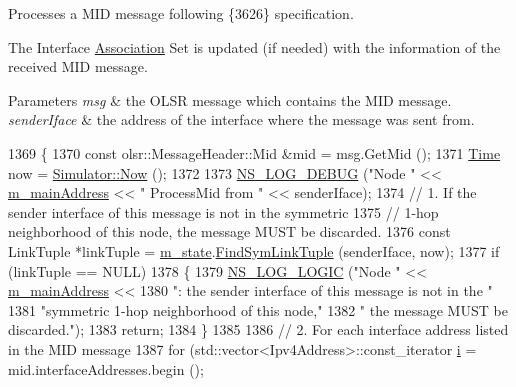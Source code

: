 Processes a M\+ID message following \{3626\} specification. 

The Interface \hyperlink{structns3_1_1olsr_1_1Association}{Association} Set is updated (if needed) with the information of the received M\+ID message.


\begin{DoxyParams}{Parameters}
{\em msg} & the O\+L\+SR message which contains the M\+ID message. \\
\hline
{\em sender\+Iface} & the address of the interface where the message was sent from. \\
\hline
\end{DoxyParams}

\begin{DoxyCode}
1369 \{
1370   \textcolor{keyword}{const} olsr::MessageHeader::Mid &mid = msg.GetMid ();
1371   \hyperlink{namespacens3_1_1TracedValueCallback_a7ffd3e7c142ffe7c8a1d2db9b8de38ec}{Time} now = \hyperlink{classns3_1_1Simulator_ac3178fa975b419f7875e7105be122800}{Simulator::Now} ();
1372 
1373   \hyperlink{group__logging_ga413f1886406d49f59a6a0a89b77b4d0a}{NS\_LOG\_DEBUG} (\textcolor{stringliteral}{"Node "} << \hyperlink{classns3_1_1olsr_1_1RoutingProtocol_a58cc50ed5d1039aab603e90e318aabfb}{m\_mainAddress} << \textcolor{stringliteral}{" ProcessMid from "} << senderIface);
1374   \textcolor{comment}{// 1. If the sender interface of this message is not in the symmetric}
1375   \textcolor{comment}{// 1-hop neighborhood of this node, the message MUST be discarded.}
1376   \textcolor{keyword}{const} LinkTuple *linkTuple = \hyperlink{classns3_1_1olsr_1_1RoutingProtocol_a07942ec1a7df71b609c8d2ff3b567c49}{m\_state}.\hyperlink{classns3_1_1olsr_1_1OlsrState_a5005529fbbd5fa4a015591a93d715890}{FindSymLinkTuple} (senderIface, now);
1377   \textcolor{keywordflow}{if} (linkTuple == NULL)
1378     \{
1379       \hyperlink{group__logging_ga88acd260151caf2db9c0fc84997f45ce}{NS\_LOG\_LOGIC} (\textcolor{stringliteral}{"Node "} << \hyperlink{classns3_1_1olsr_1_1RoutingProtocol_a58cc50ed5d1039aab603e90e318aabfb}{m\_mainAddress} <<
1380                     \textcolor{stringliteral}{": the sender interface of this message is not in the "}
1381                     \textcolor{stringliteral}{"symmetric 1-hop neighborhood of this node,"}
1382                     \textcolor{stringliteral}{" the message MUST be discarded."});
1383       \textcolor{keywordflow}{return};
1384     \}
1385 
1386   \textcolor{comment}{// 2. For each interface address listed in the MID message}
1387   \textcolor{keywordflow}{for} (std::vector<Ipv4Address>::const\_iterator \hyperlink{bernuolliDistribution_8m_a6f6ccfcf58b31cb6412107d9d5281426}{i} = mid.interfaceAddresses.begin ();

\end{DoxyCode}
